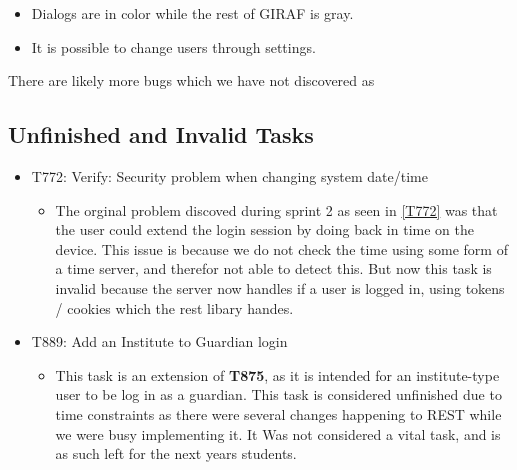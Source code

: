 \begin{itemize}
  \item Dialogs are in color while the rest of GIRAF is gray.
  \item It is possible to change users through settings.
\end{itemize}

There are likely more bugs which we have not discovered as 

\subsection{Unfinished and Invalid Tasks}\label{S4Invalid}
\begin{itemize}
  \item T772: Verify: Security problem when changing system date/time
  	\begin{itemize}
  		\item The orginal problem discoved during sprint 2 as seen in \autoref{T772}
 		was that the user could extend the login session by doing back in time on the
  		device.
		This issue is because we do not check the time using some form of a time
		server, and therefor not able to detect this.  
		But now this task is invalid because the server now handles if a user is
		logged in, using tokens / cookies which the rest libary handes.
		\end{itemize}
  \item T889: Add an Institute to Guardian login
   \begin{itemize}
     \item This task is an extension of \textbf{T875}, as it is intended for an
     institute-type user to be log in as a guardian. This task is considered
     unfinished due to time constraints as there were several changes happening
     to REST while we were busy implementing it. It Was not considered a vital
     task, and is as such left for the next years students.
   \end{itemize}
\end{itemize}